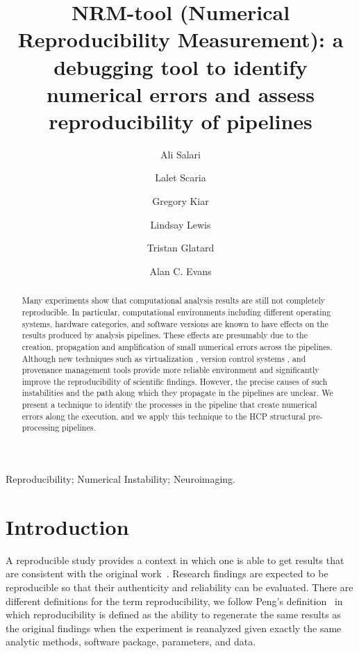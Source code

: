 \documentclass[a4paper,num-refs]{oup-contemporary}
\title{NRM-tool (Numerical Reproducibility Measurement): 
a debugging tool to identify numerical errors 
and assess reproducibility of pipelines}
\begin{document}
\author[1]{Ali Salari}
\author[1]{Lalet Scaria}
\author[2,3]{Gregory Kiar}
\author[2]{Lindsay Lewis}
\author[1]{Tristan Glatard}
\author[2,3]{Alan C. Evans}


\maketitle

\begin{abstract}
Many experiments show that computational analysis results are still not 
completely reproducible. In particular, computational environments 
including different operating systems, hardware categories, and 
software versions are known to have effects on the results produced by 
analysis pipelines. These effects are presumably due to the creation, 
propagation and amplification of small numerical errors across the 
pipelines. 
Although new techniques such as virtualization , version 
control systems , and provenance management tools provide more reliable 
environment and significantly improve the reproducibility of scientific 
findings. 
However, the precise causes of such instabilities and the path along 
which they propagate in the pipelines are unclear.  We present a 
technique to identify the processes in the pipeline that create 
numerical errors along the execution, and we apply this technique to 
the HCP structural pre-processing pipelines.

\end{abstract}

\begin{keywords}
Reproducibility; Numerical Instability; Neuroimaging.
\end{keywords}

\section{Introduction}

A reproducible study provides a context in which one is able to get 
results that are consistent with the original 
work~\cite{plesser2018reproducibility}. Research findings are expected 
to be reproducible so that their authenticity and reliability can be 
evaluated. 
There are different definitions for the term reproducibility, we follow 
Peng's definition~\cite{peng2011reproducible} in which reproducibility 
is defined as the ability to regenerate the same results as the 
original findings when the experiment is reanalyzed given exactly the 
same analytic methods, software package, parameters, and data. 
\end{document}
